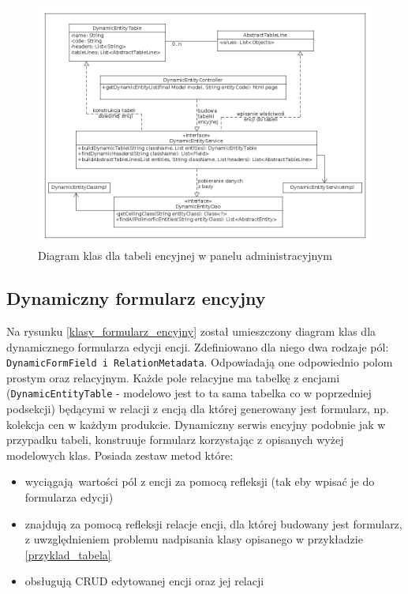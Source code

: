 \begin{figure}
	\begin{center}
		\includegraphics[scale=0.4]{klasy_tabela_encyjna.png}
	\end{center}
	\caption{{\color{black}Diagram klas dla tabeli encyjnej w panelu administracyjnym}} \label{klasy_tabela_encyjna}
\end{figure}

\subsection{Dynamiczny formularz encyjny}
Na rysunku \ref{klasy_formularz_encyjny} został umieszczony diagram klas dla dynamicznego formularza edycji encji. Zdefiniowano dla niego dwa rodzaje pól: \texttt{DynamicFormField i RelationMetadata}. Odpowiadają one odpowiednio polom prostym oraz relacyjnym. Każde pole relacyjne ma tabelkę z encjami (\texttt{DynamicEntityTable} - modelowo jest to ta sama tabelka co w poprzedniej podsekcji) będącymi w relacji z encją dla której generowany jest formularz, np. kolekcja cen w każdym produkcie. Dynamiczny serwis encyjny podobnie jak w przypadku tabeli, konstruuje formularz korzystając z opisanych wyżej modelowych klas. Posiada zestaw metod które:
\begin{itemize}
	\item wyciągają wartości pól z encji za pomocą refleksji (tak eby wpisać je do formularza edycji)
	\item znajdują za pomocą refleksji relacje encji, dla której budowany jest formularz, z uwzględnieniem problemu nadpisania klasy opisanego w przykładzie \ref{przyklad_tabela}
	\item obsługują CRUD edytowanej encji oraz jej relacji 
\end{itemize}  


